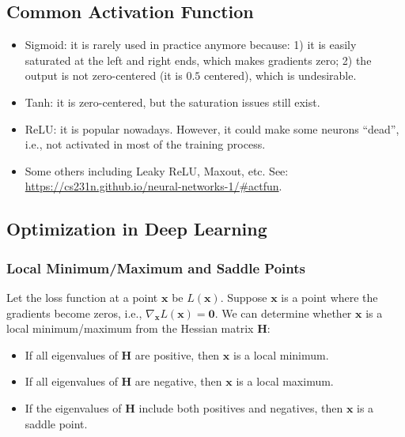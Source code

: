 \subsection{Common Activation Function}
    \begin{itemize}
        \item Sigmoid: it is rarely used in practice anymore because: 1) it is easily saturated at the left and right ends, which makes gradients zero; 2) the output is not zero-centered (it is $0.5$ centered), which is undesirable.
        \item Tanh: it is zero-centered, but the saturation issues still exist.
        \item ReLU: it is popular nowadays. However, it could make some neurons ``dead'', i.e., not activated in most of the training process.
        \item Some others including Leaky ReLU, Maxout, etc. See: \url{https://cs231n.github.io/neural-networks-1/#actfun}.
    \end{itemize}


\subsection{Optimization in Deep Learning}
    \subsubsection{Local Minimum/Maximum and Saddle Points}
    Let the loss function at a point $\bm{x}$ be $L(\bm{x})$.
    Suppose $\bm{x}$ is a point where the gradients become zeros, i.e., $\nabla_{\bm{x}}L(\bm{x}) = \bm{0}$.
    We can determine whether $\bm{x}$ is a local minimum/maximum from the Hessian matrix $\bm{H}$:
        \begin{itemize}
            \item If all eigenvalues of $\bm{H}$ are positive, then $\bm{x}$ is a local minimum.
            \item If all eigenvalues of $\bm{H}$ are negative, then $\bm{x}$ is a local maximum.
            \item If the eigenvalues of $\bm{H}$ include both positives and negatives, then $\bm{x}$ is a saddle point.
        \end{itemize}
        

